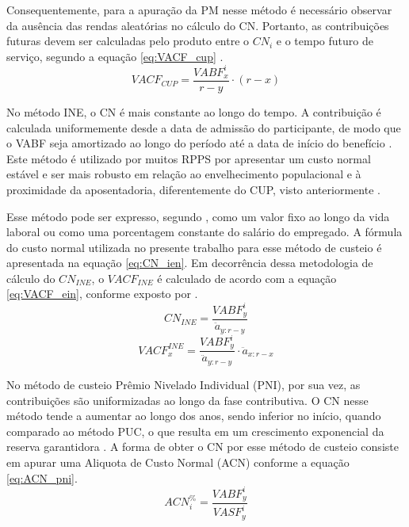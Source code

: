 Consequentemente, para a apuração da PM nesse método é necessário observar da ausência das rendas aleatórias no cálculo do CN. Portanto, as contribuições futuras devem ser calculadas pelo produto entre o $CN_i$ e o tempo futuro de serviço, segundo a equação \ref{eq:VACF_cup} \cite{almeidavieira2024}.
\begin{equation}
    VACF_{CUP} = \frac{VABF^{i}_{x}}{r-y} \cdot (r - x)
    \label{eq:VACF_cup}
\end{equation}


No método INE, o CN é mais constante ao longo do tempo. A contribuição é calculada uniformemente desde a data de admissão do participante, de modo que o VABF seja amortizado ao longo do período até a data de início do benefício \cite{winklevoos1993, andreson1992}. Este método é utilizado por muitos RPPS por apresentar um custo normal estável e ser mais robusto em relação ao envelhecimento populacional e à proximidade da aposentadoria, diferentemente do CUP, visto anteriormente \cite{almeidavieira2024}.

Esse método pode ser expresso, segundo , como um valor fixo ao longo da vida laboral ou como uma porcentagem constante do salário do empregado. A fórmula do custo normal utilizada no presente trabalho para esse método de custeio é apresentada na equação \ref{eq:CN_ien}. Em decorrência dessa metodologia de cálculo do $CN_{INE}$, o $VACF_{INE}$ é calculado de acordo com a equação \ref{eq:VACF_ein}, conforme exposto por .
\begin{equation}
    CN_{INE} = \frac{VABF^{i}_{y}}{\ddot{a}_{y:r-y}}
    \label{eq:CN_ien}
\end{equation}
\begin{equation}
    VACF^{INE}_{x} = \frac{VABF^{i}_{y}}{\ddot{a}_{y:r-y}} \cdot \ddot{a}_{x:r-x}
    \label{eq:VACF_ein}
\end{equation}

No método de custeio Prêmio Nivelado Individual (PNI), por sua vez, as contribuições são uniformizadas ao longo da fase contributiva. O CN nesse método tende a aumentar ao longo dos anos, sendo inferior no início, quando comparado ao método PUC, o que resulta em um crescimento exponencial da reserva garantidora \cite{almeidavieira2024}. A forma de obter o CN por esse método de custeio consiste em apurar uma Aliquota de Custo Normal (ACN) conforme a equação \ref{eq:ACN_pni}.
\begin{equation}
    ACN^{\%}_{i} = \frac{VABF^{i}_{y}}{VASF^{i}_{y}}
    \label{eq:ACN_pni}
\end{equation}

